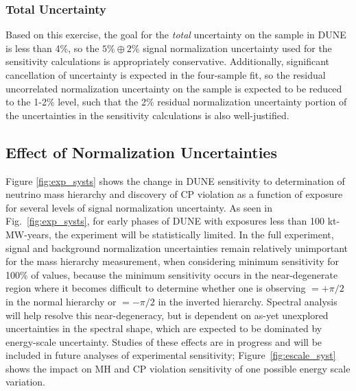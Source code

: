 \subsubsection{Total Uncertainty}
Based on this exercise, the goal for the \emph{total} uncertainty on the \nue sample in
DUNE is less than 4\%, so the $5\% \oplus 2\%$ \nue signal normalization uncertainty
used for the sensitivity calculations is appropriately conservative.
Additionally, significant cancellation of uncertainty is expected in the four-sample fit, so the
residual uncorrelated normalization uncertainty on the \nue sample is expected to be reduced to the 1-2\% level,
such that the 2\% residual normalization uncertainty portion of the uncertainties in the sensitivity calculations
is also well-justified.

\subsection{Effect of Normalization Uncertainties}
Figure \ref{fig:exp_systs} shows the
change in DUNE sensitivity to determination of
neutrino mass hierarchy and discovery of CP violation
as a function of exposure for several levels of signal normalization uncertainty.
As seen in Fig.~\ref{fig:exp_systs}, for early phases of DUNE
with exposures less than 100 kt-MW-years, the experiment
will be statistically limited. In the full experiment, signal and
background normalization uncertainties remain
relatively unimportant for the mass hierarchy measurement, when considering
minimum sensitivity for 100\% of \deltacp values, because the minimum sensitivity 
occurs in the near-degenerate region where it becomes difficult to determine
whether one is observing \deltacp $= + \pi/2 $ in the normal hierarchy
or \deltacp $=-\pi/2$ in the inverted hierarchy. Spectral analysis will
help resolve this near-degeneracy, but is dependent on as-yet
unexplored uncertainties in the spectral shape, which are expected to be dominated
by energy-scale uncertainty. Studies of these effects are in progress and will be included in
future analyses of experimental sensitivity; Figure~\ref{fig:escale_syst} shows the
impact on MH and CP violation sensitivity of one possible energy scale variation.
